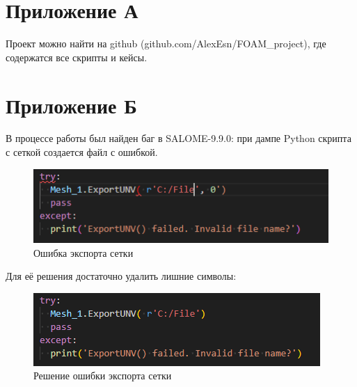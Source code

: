 \documentclass[a4paper,12pt]{article}
\theoremstyle{plain} %
\theoremstyle{definition} %
\theoremstyle{remark} %
\begin{document}
\newpage

\newpage
\section{Приложение А}
Проект можно найти на github (github.com/AlexEsn/FOAM\_project), где содержатся все скрипты и кейсы.

\newpage
\section{Приложение Б}
В процессе работы был найден баг в SALOME-9.9.0: при дампе Python скрипта с сеткой создается файл с ошибкой.

\begin{figure}[h]
	\begin{center}
		\includegraphics[width=1\linewidth]{e.png}
		\caption{Ошибка экспорта сетки} %
	\end{center}
\end{figure}

Для её решения достаточно удалить лишние символы:
\begin{figure}[h]
	\begin{center}
		\includegraphics[width=1\linewidth]{er.png}
		\caption{Решение ошибки экспорта сетки} %
	\end{center}
\end{figure}
\end{document}
